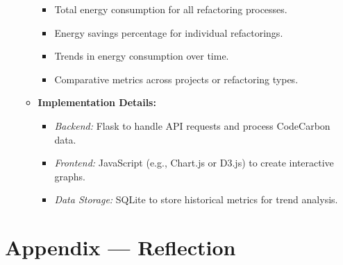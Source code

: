 \documentclass[12pt]{article}
\begin{document}
\begin{itemize}
\begin{itemize}
        \begin{itemize}
            \item Total energy consumption for all refactoring processes.
            \item Energy savings percentage for individual refactorings.
            \item Trends in energy consumption over time.
            \item Comparative metrics across projects or refactoring types.
        \end{itemize}
        \item \textbf{Implementation Details:} 
        \begin{itemize}
            \item \textit{Backend:} Flask to handle API requests and process CodeCarbon data.
            \item \textit{Frontend:} JavaScript (e.g., Chart.js or D3.js) to create interactive graphs.
            \item \textit{Data Storage:} SQLite to store historical metrics for trend analysis.
        \end{itemize}
    \end{itemize}
\end{itemize}

\newpage{}
\section*{Appendix --- Reflection}
\end{document}

